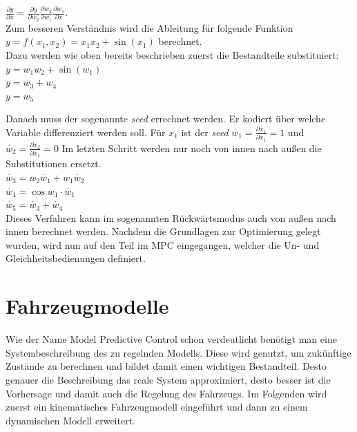 \documentclass{like}
\begin{document}
$\frac{\partial y}{\partial x} = \frac{\partial y}{\partial w_2} \frac{\partial w_2}{\partial w_1} \frac{\partial w_1}{\partial x}$. \\
Zum besseren Verständnis wird die Ableitung für folgende Funktion
$y = f(x_1, x_2) = x_1x_2 + \sin(x_1)$ berechnet.\\
Dazu werden wie oben bereits beschrieben zuerst die Bestandteile substituiert:\\
$y = w_1w_2 + \sin(w_1) $ \\
$y = w_3 + w_4$ \\
$y = w_5$

Danach muss der sogenannte \textit{seed} errechnet werden. Er kodiert über welche Variable differenziert werden soll. Für $x_1$ ist der \textit{seed} $\dot{w_1} = \frac{\partial x_1}{\partial x_1} = 1$ und   $\dot{w_2} = \frac{\partial x_2}{\partial x_1} = 0$
Im letzten Schritt werden nur noch von innen nach außen die Substitutionen ersetzt. \\
$\dot{w_3} = w_2\dot{w_1} + w_1 \dot{w_2}$ \\
$\dot{w_4} = \cos{w_1} \cdot \dot{w_1}$ \\
$\dot{w_5} = \dot{w_3} + \dot{w_4}$ \\
Dieses Verfahren kann im sogenannten Rückwärtsmodus auch von außen nach innen berechnet werden. Nachdem die Grundlagen zur Optimierung gelegt wurden, wird nun auf den Teil im \acl{MPC} eingegangen, welcher die Un- und Gleichheitsbedienungen definiert. 


\section{Fahrzeugmodelle}

Wie der Name Model Predictive Control schon verdeutlicht benötigt man eine Systembeschreibung des zu regelnden Modells. Diese wird genutzt, um zukünftige Zustände zu berechnen und bildet damit einen wichtigen Bestandteil. Desto genauer die Beschreibung das reale System approximiert, desto besser ist die Vorhersage und damit auch die Regelung des Fahrzeugs.
Im Folgenden wird zuerst ein kinematisches Fahrzeugmodell eingeführt und dann zu einem dynamischen Modell erweitert.   
\end{document}
